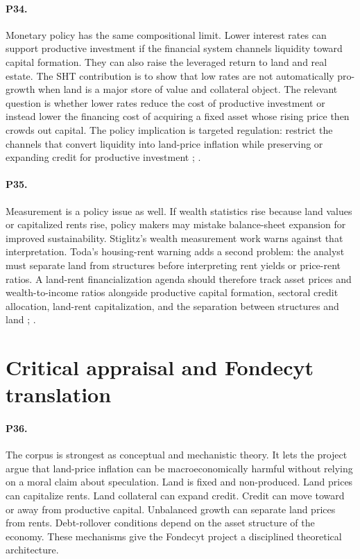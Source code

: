 \documentclass[11pt]{article}
\begin{document}
\paragraph{P34.} Monetary policy has the same compositional limit. Lower interest rates can support productive investment if the financial system channels liquidity toward capital formation. They can also raise the leveraged return to land and real estate. The SHT contribution is to show that low rates are not automatically pro-growth when land is a major store of value and collateral object. The relevant question is whether lower rates reduce the cost of productive investment or instead lower the financing cost of acquiring a fixed asset whose rising price then crowds out capital. The policy implication is targeted regulation: restrict the channels that convert liquidity into land-price inflation while preserving or expanding credit for productive investment \citep[pp.~1--4]{hiranoStiglitz2025LowInterestPolicy}; \citep[pp.~1, 15, 33, 38]{hiranoStiglitz2024CreditLandGrowth}.

\paragraph{P35.} Measurement is a policy issue as well. If wealth statistics rise because land values or capitalized rents rise, policy makers may mistake balance-sheet expansion for improved sustainability. Stiglitz's wealth measurement work warns against that interpretation. Toda's housing-rent warning adds a second problem: the analyst must separate land from structures before interpreting rent yields or price-rent ratios. A land-rent financialization agenda should therefore track asset prices and wealth-to-income ratios alongside productive capital formation, sectoral credit allocation, land-rent capitalization, and the separation between structures and land \citep[pp.~1--2, 4, 11]{stiglitz2015MeasurementWealth}; \citep[pp.~1--3]{toda2025LandBubbles}.

\section{Critical appraisal and Fondecyt translation}

\paragraph{P36.} The corpus is strongest as conceptual and mechanistic theory. It lets the project argue that land-price inflation can be macroeconomically harmful without relying on a moral claim about speculation. Land is fixed and non-produced. Land prices can capitalize rents. Land collateral can expand credit. Credit can move toward or away from productive capital. Unbalanced growth can separate land prices from rents. Debt-rollover conditions depend on the asset structure of the economy. These mechanisms give the Fondecyt project a disciplined theoretical architecture.
\end{document}
